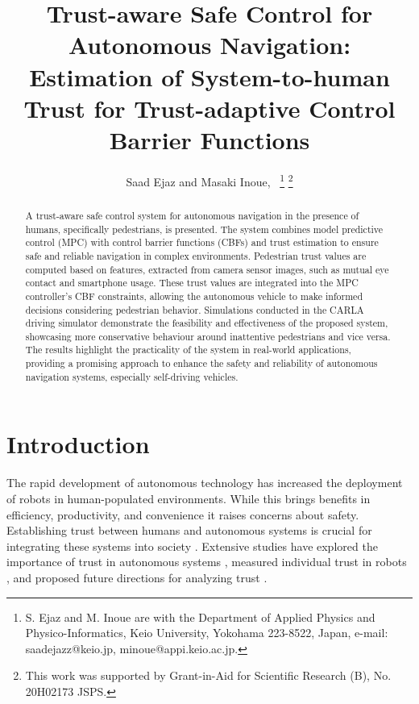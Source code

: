 \documentclass[journal]{IEEEtran}
\begin{document}
\title{Trust-aware Safe Control for Autonomous Navigation: Estimation of System-to-human Trust for Trust-adaptive Control Barrier Functions}

\author{
Saad Ejaz and Masaki Inoue,~%
\thanks{S. Ejaz and M. Inoue are with the Department
of Applied Physics and Physico-Informatics, Keio University,
Yokohama 223-8522, Japan, e-mail: saadejazz@keio.jp, minoue@appi.keio.ac.jp.}%
\thanks{This work was supported by Grant-in-Aid for Scientific Research (B), No. 20H02173 JSPS.}
}

\DeclarePairedDelimiter\abs{\lvert}{\rvert}
\DeclarePairedDelimiter\norm{\lVert}{\rVert}

\maketitle


\begin{abstract}
A trust-aware safe control system for autonomous navigation in the presence of humans, specifically pedestrians, is presented. The system combines model predictive control (MPC) with control barrier functions (CBFs) and trust estimation to ensure safe and reliable navigation in complex environments. Pedestrian trust values are computed based on features, extracted from camera sensor images, such as mutual eye contact and smartphone usage. These trust values are integrated into the MPC controller's CBF constraints, allowing the autonomous vehicle to make informed decisions considering pedestrian behavior. Simulations conducted in the CARLA driving simulator demonstrate the feasibility and effectiveness of the proposed system, showcasing more conservative behaviour around inattentive pedestrians and vice versa. The results highlight the practicality of the system in real-world applications, providing a promising approach to enhance the safety and reliability of autonomous navigation systems, especially self-driving vehicles.
\end{abstract}

\section{Introduction}
The rapid development of autonomous technology has increased the deployment of robots in human-populated environments. While this brings benefits in efficiency, productivity, and convenience it raises concerns about safety. Establishing trust between humans and autonomous systems is crucial for integrating these systems into society \cite{beer2014toward}. Extensive studies have explored the importance of trust in autonomous systems \cite{adams2003trust}, measured individual trust in robots \cite{schaefer2013perception}, and proposed future directions for analyzing trust \cite{nahavandi2019trust}.
\end{document}
